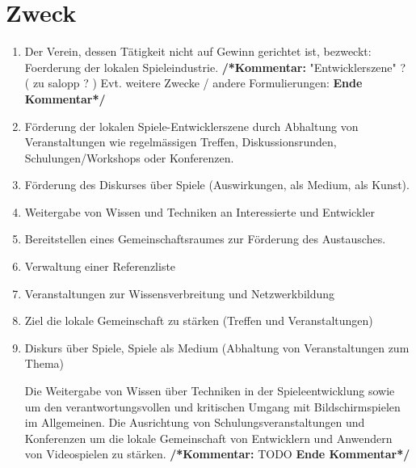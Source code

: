 \documentclass[a4paper,12pt]{article}
\newcommand{\comment}[1]{{\bf /*Kommentar:} #1 {\bf Ende Kommentar*/}}
\begin{document}
\section{Zweck} %
\label{sec:Zweck}
\begin{enumerate}
\item Der Verein, dessen Tätigkeit nicht auf Gewinn gerichtet ist, bezweckt:
Foerderung der lokalen Spieleindustrie.
\comment{"Entwicklerszene" ? ( zu salopp ? )
Evt. weitere Zwecke / andere Formulierungen:}
\item Förderung der lokalen Spiele-Entwicklerszene durch Abhaltung von Veranstaltungen wie regelmässigen Treffen, Diskussionsrunden, Schulungen/Workshops oder Konferenzen.
\item Förderung des Diskurses über Spiele (Auswirkungen, als Medium, als Kunst).
\item Weitergabe von Wissen und Techniken an Interessierte und Entwickler
\item Bereitstellen eines Gemeinschaftsraumes zur Förderung des Austausches.
\item Verwaltung einer Referenzliste
\item Veranstaltungen zur Wissensverbreitung und Netzwerkbildung
\item Ziel die lokale Gemeinschaft zu stärken (Treffen und Veranstaltungen)
\item Diskurs über Spiele, Spiele als Medium (Abhaltung von Veranstaltungen zum Thema)

Die Weitergabe von Wissen über Techniken in der Spieleentwicklung sowie um den verantwortungsvollen und kritischen Umgang mit Bildschirmspielen im Allgemeinen. Die Ausrichtung von Schulungsveranstaltungen und Konferenzen um die lokale Gemeinschaft von Entwicklern und Anwendern von Videospielen zu stärken.
\comment{TODO}
\end{enumerate}
\end{document}
